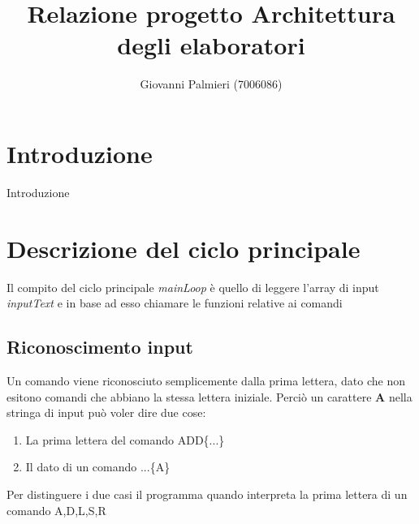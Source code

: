 \documentclass[a4paper,12pt]{article}
\title{Relazione progetto Architettura degli elaboratori}
\author{Giovanni Palmieri (7006086)}
\begin{document}
\maketitle

\tableofcontents


\section{Introduzione}
Introduzione


\section{Descrizione del ciclo principale}

Il compito del ciclo principale \textit{mainLoop} è quello di leggere 
l'array di input \textit{inputText} e in base ad esso chiamare le funzioni relative ai comandi

\subsection{Riconoscimento input}
Un comando viene riconosciuto semplicemente dalla prima lettera, dato che non esitono comandi che abbiano la stessa lettera iniziale.
Perciò un carattere \textbf{A} nella stringa di input può voler dire due cose:
\begin{enumerate}
    \item La prima lettera del comando ADD\{...\}
    \item Il dato di un comando ...\{A\}
\end{enumerate}

Per distinguere i due casi il programma quando interpreta la prima lettera di un comando {A,D,L,S,R} 
\end{document}
